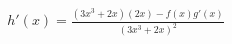 \documentclass[preview]{standalone}
\begin{document}
\begin{align*}
h'(x) = \frac{(3x^3+2x)(2x)-f(x)g'(x)}{(3x^3+2x)^2}
\end{align*}
\end{document}

